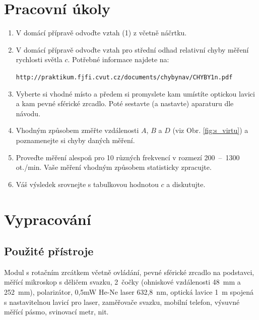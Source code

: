 \documentclass[english]{article}
\begin{document}


\setlength{\parindent}{0.5cm}
\section{Pracovní úkoly}
\begin{enumerate}
\item V domácí přípravě odvoďte vztah (1) z \cite{bib:zadani} včetně náčrtku.

\item V domácí přípravě odvoďte vztah pro střední odhad relativní chyby měření rychlosti světla $c$. Potřebné informace najdete na: 

\texttt{http://praktikum.fjfi.cvut.cz/documents/chybynav/CHYBY1n.pdf}

\item Vyberte si vhodné místo a předem si promyslete kam umístíte optickou lavici a kam pevné sférické zrcadlo. Poté sestavte (a nastavte) aparaturu dle návodu.

\item Vhodným způsobem změřte vzdálenosti $A$, $B$ a $D$ (viz Obr. \ref{fig:s_virtu}) a poznamenejte si chyby daných měření.

\item Proveďte měření alespoň pro 10 různých frekvencí v rozmezí 200~--~1300 ot./min. Vaše měření vhodným způsobem statisticky zpracujte.

\item Váš výsledek srovnejte s tabulkovou hodnotou $c$ a diskutujte.

\end{enumerate}

	
\section{Vypracování}

	\subsection{Použité přístroje}
		Modul s rotačním zrcátkem včetně ovládání, pevné sférické zrcadlo na podstavci, měřící mikroskop s děličem svazku, 2~čočky (ohniskové vzdálenosti 48~mm a 252~mm), polarizátor, 0,5mW He-Ne laser 632,8~nm, optická lavice 1~m spojená s nastavitelnou lavicí pro laser, zaměřovače svazku, mobilní telefon, výsuvné měřící pásmo, svinovací metr, nit.
			
\end{document}
